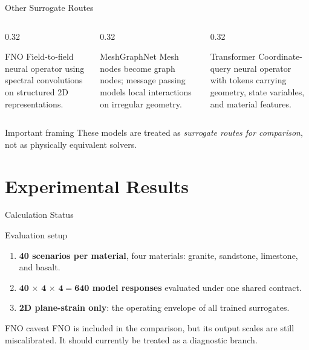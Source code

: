 \documentclass[aspectratio=169,10pt]{beamer}
\begin{document}
\begin{frame}{Other Surrogate Routes}
  \begin{columns}[T]
    \begin{column}{0.32\textwidth}
      \begin{block}{FNO}
        \footnotesize
        Field-to-field neural operator using spectral convolutions on
        structured 2D representations.
      \end{block}
    \end{column}
    \begin{column}{0.32\textwidth}
      \begin{block}{MeshGraphNet}
        \footnotesize
        Mesh nodes become graph nodes; message passing models local
        interactions on irregular geometry.
      \end{block}
    \end{column}
    \begin{column}{0.32\textwidth}
      \begin{block}{Transformer}
        \footnotesize
        Coordinate-query neural operator with tokens carrying geometry,
        state variables, and material features.
      \end{block}
    \end{column}
  \end{columns}
  \vskip 6pt
  \begin{alertblock}{Important framing}
    These models are treated as \emph{surrogate routes for comparison},
    not as physically equivalent solvers.
  \end{alertblock}
\end{frame}

\section{Experimental Results}

\begin{frame}{Calculation Status}
  \begin{block}{Evaluation setup}
    \begin{enumerate}
      \item \textbf{40 scenarios per material}, four materials:
            granite, sandstone, limestone, and basalt.
      \item \textbf{$\mathbf{40\,\times\,4\,\times\,4 = 640}$ model
            responses} evaluated under one shared contract.
      \item \textbf{2D plane-strain only}: the operating envelope of
            all trained surrogates.
    \end{enumerate}
  \end{block}
  \begin{alertblock}{FNO caveat}
    \footnotesize
    FNO is included in the comparison, but its output scales are still
    miscalibrated. It should currently be treated as a diagnostic branch.
  \end{alertblock}
\end{frame}
\end{document}
